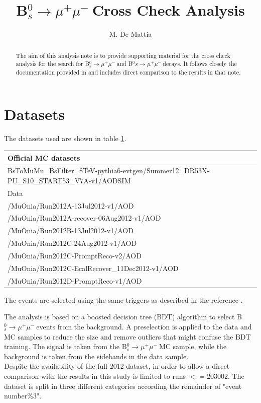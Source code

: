 \documentclass[10pt,a4paper]{article}
\author{M. De Mattia}
\newcommand{\BsMuMu}{B$^{0}_{s}\rightarrow \mu^+\mu^-\ $}
\newcommand{\BMuMu}{B$^{0}s\rightarrow \mu^+\mu^-\ $}
\begin{document}
\title{\BsMuMu Cross Check Analysis}
\maketitle

\begin{abstract}
The aim of this analysis note is to provide supporting material for the cross check analysis for the
search for \BsMuMu and \BMuMu decays. It follows closely the documentation provided in \cite{MainAN}
and includes direct comparison to the results in that note.
\end{abstract}

\section{Datasets}

The datasets used are shown in table \ref{tab:datasets}.
\begin{table}
\begin{tabular}{|l|}
\hline
Official MC datasets \\
\hline
BsToMuMu\_BsFilter\_8TeV-pythia6-evtgen/Summer12\_DR53X-PU\_S10\_START53\_V7A-v1/AODSIM \\
\hline
Data \\
/MuOnia/Run2012A-13Jul2012-v1/AOD \\
/MuOnia/Run2012A-recover-06Aug2012-v1/AOD \\
/MuOnia/Run2012B-13Jul2012-v1/AOD \\
/MuOnia/Run2012C-24Aug2012-v1/AOD \\
/MuOnia/Run2012C-PromptReco-v2/AOD \\
/MuOnia/Run2012C-EcalRecover\_11Dec2012-v1/AOD \\
/MuOnia/Run2012D-PromptReco-v1/AOD \\
\hline
\end{tabular}
\label{tab:datasets}
\end{table}

The events are selected using the same triggers as described in the reference \cite{MainAN}.

The analysis is based on a boosted decision tree (BDT) algorithm to select \BsMuMu events from the
background.
A preselection is applied to the data and MC samples to reduce the size and remove outliers that
might confuse the BDT training.
The signal is taken from the \BsMuMu MC sample, while the background is taken from the sidebands
in the data sample.
\\
Despite the availability of the full 2012 dataset, in order to allow a direct comparison with
the results in \cite{MainAN} this study is limited to runs $<= 203002$.
The dataset is split in three different categories according the remainder of "event number$\%3$".
\end{document}
